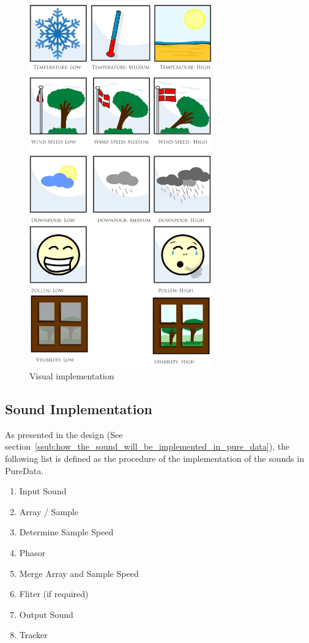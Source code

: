 \begin{figure}[!htbp]
    \centering
    \includegraphics[width=0.7\textwidth]{images/Implementation11.jpg}
    \caption{Visual implementation}
    \label{fig:implementation11}
\end{figure}



\FloatBarrier
\subsection{Sound Implementation} %
\label{sub:sound_implementation}

As presented in the design (See section~\ref{ssub:how_the_sound_will_be_implemented_in_pure_data}), the following list is defined as the procedure of the implementation of the sounds in PureData.

\begin{enumerate}
    \item Input Sound
    \item Array / Sample
    \item Determine Sample Speed
    \item Phasor
    \item Merge Array and Sample Speed
    \item Fliter (if required)
    \item Output Sound
    \item Tracker
\end{enumerate}

